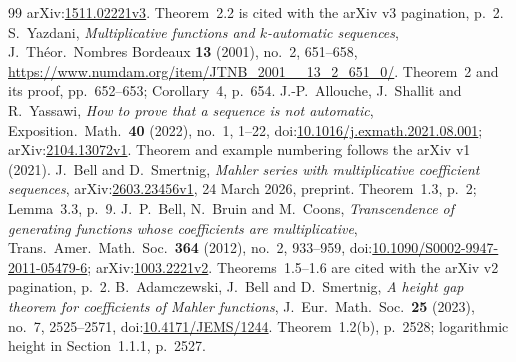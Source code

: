 \documentclass[11pt]{article}
\begin{document}
\begin{thebibliography}{99}
arXiv:\href{https://arxiv.org/abs/1511.02221v3}{1511.02221v3}.
Theorem~2.2 is cited with the arXiv v3 pagination, p.~2.
 S.~Yazdani,
\emph{Multiplicative functions and $k$-automatic sequences},
J.\ Th\'eor.\ Nombres Bordeaux \textbf{13} (2001), no.~2, 651--658,
\url{https://www.numdam.org/item/JTNB_2001__13_2_651_0/}.
Theorem~2 and its proof, pp.~652--653; Corollary~4, p.~654.
 J.-P.~Allouche, J.~Shallit and R.~Yassawi,
\emph{How to prove that a sequence is not automatic},
Exposition.\ Math.\ \textbf{40} (2022), no.~1, 1--22,
doi:\href{https://doi.org/10.1016/j.exmath.2021.08.001}{10.1016/j.exmath.2021.08.001};
arXiv:\href{https://arxiv.org/abs/2104.13072v1}{2104.13072v1}.
Theorem and example numbering follows the arXiv v1 (2021).
 J.~Bell and D.~Smertnig,
\emph{Mahler series with multiplicative coefficient sequences},
arXiv:\href{https://arxiv.org/abs/2603.23456v1}{2603.23456v1},
24 March 2026, preprint. Theorem~1.3, p.~2; Lemma~3.3, p.~9.
 J.~P.~Bell, N.~Bruin and M.~Coons,
\emph{Transcendence of generating functions whose coefficients are multiplicative},
Trans.\ Amer.\ Math.\ Soc.\ \textbf{364} (2012), no.~2, 933--959,
doi:\href{https://doi.org/10.1090/S0002-9947-2011-05479-6}{10.1090/S0002-9947-2011-05479-6};
arXiv:\href{https://arxiv.org/abs/1003.2221v2}{1003.2221v2}.
Theorems~1.5--1.6 are cited with the arXiv v2 pagination, p.~2.
B.~Adamczewski, J.~Bell and D.~Smertnig,
\emph{A height gap theorem for coefficients of Mahler functions},
J.~Eur.~Math.~Soc.\ \textbf{25} (2023), no.~7, 2525--2571,
doi:\href{https://doi.org/10.4171/JEMS/1244}{10.4171/JEMS/1244}.
Theorem~1.2(b), p.~2528; logarithmic height in Section~1.1.1, p.~2527.
\end{thebibliography}
\end{document}
